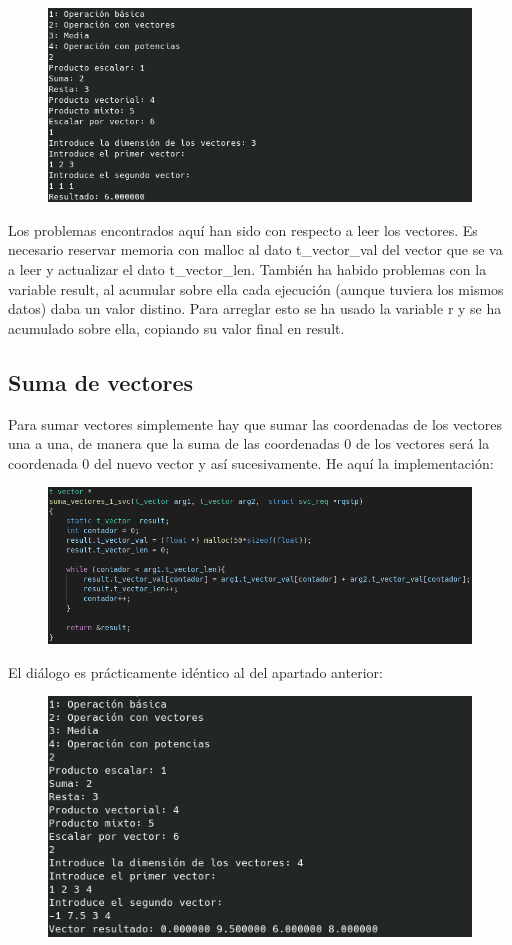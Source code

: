 \documentclass{article}
\begin{document}
	\begin{figure}[H]
		\centering
		\includegraphics[totalheight=5.5cm]{img/7.png}
	\end{figure}
	Los problemas encontrados aquí han sido con respecto a leer los vectores. Es necesario reservar memoria con malloc al dato t\_vector\_val del vector que se va a leer y actualizar el dato t\_vector\_len. También ha habido problemas con la variable result, al acumular sobre ella cada ejecución (aunque tuviera los mismos datos) daba un valor distino. Para arreglar esto se ha usado la variable r y se ha acumulado sobre ella, copiando su valor final en result.
	\subsection{Suma de vectores}
	Para sumar vectores simplemente hay que sumar las coordenadas de los vectores una a una, de manera que la suma de las coordenadas 0 de los vectores será la coordenada 0 del nuevo vector y así sucesivamente. He aquí la implementación:
	\begin{figure}[H]
		\centering
		\includegraphics[totalheight=4.6cm]{img/8.png}
	\end{figure}
	El diálogo es prácticamente idéntico al del apartado anterior:
	\begin{figure}[H]
		\centering
		\includegraphics[totalheight=7.2cm]{img/9.png}
	\end{figure}
\end{document}
